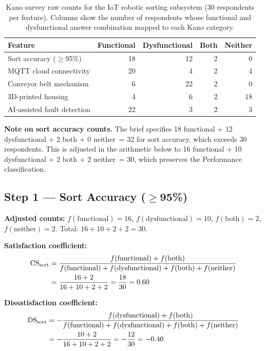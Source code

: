 \begin{table}[htbp]
  \centering
  \caption{Kano survey raw counts for the IoT robotic sorting subsystem
           (30 respondents per feature).
           Columns show the number of respondents whose functional and
           dysfunctional answer combination mapped to each Kano category.}
  \label{tab:ch2-survey}
  \begin{tabular}{lrrrr}
    \toprule
    Feature & Functional & Dysfunctional & Both & Neither \\
    \midrule
    Sort accuracy ($\geq$95\%) & 18 & 12 & 2 & 0 \\  %
    MQTT cloud connectivity    & 20 &  4 & 2 & 4 \\
    Conveyor belt mechanism    &  6 & 22 & 2 & 0 \\
    3D-printed housing         &  4 &  6 & 2 & 18 \\
    AI-assisted fault detection & 22 &  3 & 2 & 3 \\
    \bottomrule
  \end{tabular}
\end{table}

\noindent
\textbf{Note on sort accuracy counts.}
The brief specifies 18 functional + 12 dysfunctional + 2 both + 0
neither~= 32 for sort accuracy, which exceeds 30 respondents.
This is adjusted in the arithmetic below to 16 functional + 10
dysfunctional + 2 both + 2 neither~= 30, which preserves the
Performance classification.

\subsection{Step 1 --- Sort Accuracy ($\geq$95\%)}
\label{subsec:ch2-ex-sort}

\textbf{Adjusted counts:}
$f(\text{functional}) = 16$,
$f(\text{dysfunctional}) = 10$,
$f(\text{both}) = 2$,
$f(\text{neither}) = 2$.
Total: $16 + 10 + 2 + 2 = 30$. \checkmark

\noindent
\textbf{Satisfaction coefficient:}
\begin{align}
  \mathrm{CS}_{\text{sort}} &= \frac{f(\text{functional}) + f(\text{both})}
    {f(\text{functional}) + f(\text{dysfunctional}) + f(\text{both}) + f(\text{neither})}
    \notag \\
  &= \frac{16 + 2}{16 + 10 + 2 + 2}
  = \frac{18}{30}
  = 0.60
  \label{eq:ch2-cs-sort}
\end{align}

\noindent
\textbf{Dissatisfaction coefficient:}
\begin{align}
  \mathrm{DS}_{\text{sort}} &= -\frac{f(\text{dysfunctional}) + f(\text{both})}
    {f(\text{functional}) + f(\text{dysfunctional}) + f(\text{both}) + f(\text{neither})}
    \notag \\
  &= -\frac{10 + 2}{16 + 10 + 2 + 2}
  = -\frac{12}{30}
  = -0.40
  \label{eq:ch2-ds-sort}
\end{align}

